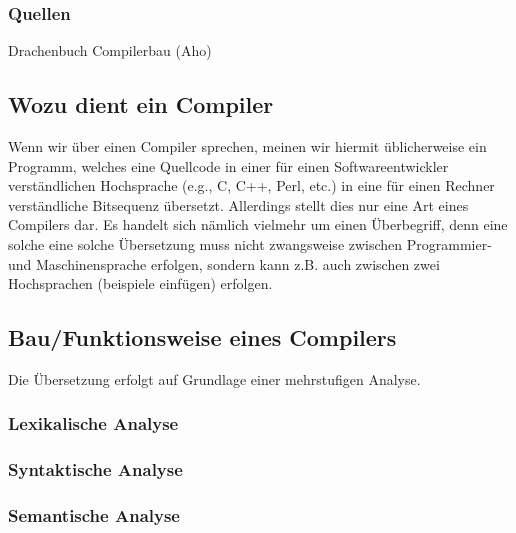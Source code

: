 \documentclass[
]{article}
\author{}
\date{}
\begin{document}
\subsubsection{Quellen}\label{quellen}

Drachenbuch Compilerbau (Aho)

\subsection{Wozu dient ein Compiler}\label{wozu-dient-ein-compiler}

Wenn wir über einen Compiler sprechen, meinen wir hiermit üblicherweise
ein Programm, welches eine Quellcode in einer für einen
Softwareentwickler verständlichen Hochsprache (e.g., C, C++, Perl, etc.)
in eine für einen Rechner verständliche Bitsequenz übersetzt. Allerdings
stellt dies nur eine Art eines Compilers dar. Es handelt sich nämlich
vielmehr um einen Überbegriff, denn eine solche eine solche Übersetzung
muss nicht zwangsweise zwischen Programmier- und Maschinensprache
erfolgen, sondern kann z.B. auch zwischen zwei Hochsprachen (beispiele
einfügen) erfolgen.

\subsection{Bau/Funktionsweise eines
Compilers}\label{baufunktionsweise-eines-compilers}

Die Übersetzung erfolgt auf Grundlage einer mehrstufigen Analyse.

\subsubsection{Lexikalische Analyse}\label{lexikalische-analyse}

\subsubsection{Syntaktische Analyse}\label{syntaktische-analyse}

\subsubsection{Semantische Analyse}\label{semantische-analyse}
\end{document}
